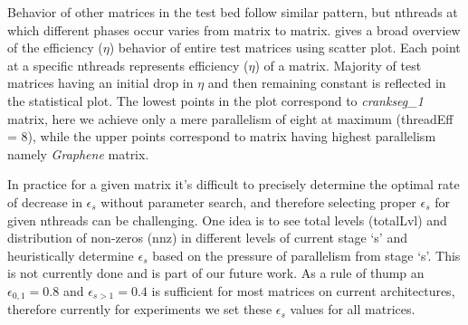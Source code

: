 Behavior of other matrices in the test bed follow similar pattern, but \acrshort{nthreads} at which different phases occur varies from matrix to matrix.   gives a broad overview of the efficiency ($\eta$) behavior of entire test matrices using scatter plot. Each point at a specific \acrshort{nthreads} represents efficiency ($\eta$) of a matrix. Majority of test matrices having an initial drop in $\eta$ and then remaining constant is reflected in the statistical plot. The lowest points in the plot correspond to \emph{crankseg\_1} matrix, here we achieve only a mere parallelism of eight at maximum (\acrshort{threadEff} = 8), while the upper points correspond to matrix having highest parallelism namely \emph{Graphene} matrix.

In practice for a given matrix it's difficult to precisely determine the optimal rate of decrease in $\epsilon_s$ without parameter search, and therefore selecting proper $\epsilon_s$ for given \acrshort{nthreads} can be challenging. One idea is to see total levels (\acrshort{totalLvl}) and distribution of non-zeros (\acrshort{nnz}) in different levels of current stage `s' and heuristically determine $\epsilon_s$ based on the pressure of parallelism from stage `s'. This is not currently done and is part of our future work. As a rule of thump an $\epsilon_{0,1} = 0.8$ and $\epsilon_{s>1} = 0.4$ is sufficient for most matrices on current architectures, therefore currently for experiments we set these $\epsilon_s$ values for all matrices.

